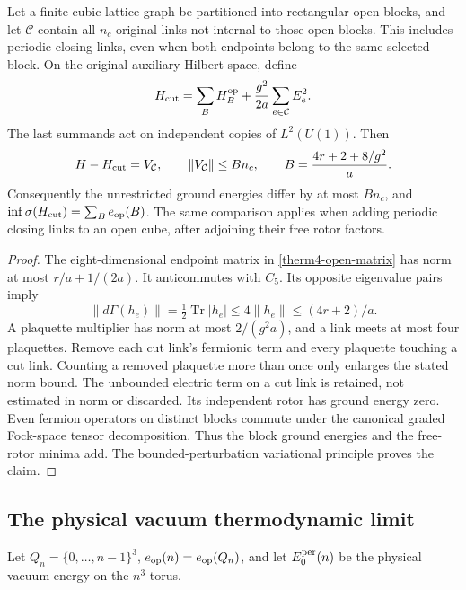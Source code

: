 \begin{lemma}
\label{therm4-cut}
Let a finite cubic lattice graph be partitioned into rectangular
open blocks, and let $\mathcal C$ contain all $n_c$ original links
not internal to those open blocks. This includes periodic closing
links, even when both endpoints belong to the same selected block.
On the original auxiliary Hilbert space, define
\[
 H_{\rm cut}=\sum_B H_B^{\rm op}
                 +\frac{g^2}{2a}\sum_{e\in\mathcal C}E_e^2.
\]
The last summands act on independent copies of $L^2(U(1))$.
Then
\begin{equation}
 H-H_{\rm cut}=V_{\mathcal C},\qquad
 \|V_{\mathcal C}\|\le Bn_c,\qquad
 B=\frac{4r+2+8/g^2}{a}.
 \label{therm4-cut-norm}
\end{equation}
Consequently the unrestricted ground energies differ by at most
$Bn_c$, and $\inf\sigma(H_{\rm cut})=\sum_B e_{\rm op}(B)$.
The same comparison applies when adding periodic closing links to an
open cube, after adjoining their free rotor factors.
\end{lemma}
\begin{proof}
The eight-dimensional endpoint matrix in \eqref{therm4-open-matrix}
has norm at most $r/a+1/(2a)$.  It anticommutes with $C_5$.
Its opposite eigenvalue pairs imply
\[
 \|d\Gamma(h_e)\|=\tfrac12\operatorname{Tr}|h_e|
 \le4\|h_e\|\le(4r+2)/a.
\]
A plaquette multiplier has norm at most $2/(g^2a)$, and a link meets
at most four plaquettes.  Remove each cut link's fermionic term and
every plaquette touching a cut link.  Counting a removed plaquette
more than once only enlarges the stated norm bound.
The unbounded electric term on a cut link is retained, not estimated
in norm or discarded.  Its independent rotor has ground energy zero.
Even fermion operators on distinct blocks commute under the canonical
graded Fock-space tensor decomposition.  Thus the block ground
energies and the free-rotor minima add.  The bounded-perturbation
variational principle proves the claim.
\end{proof}

\subsection{The physical vacuum thermodynamic limit}

Let $Q_n=\{0,\ldots,n-1\}^3$, $e_{\rm op}(n)=e_{\rm op}(Q_n)$, and
let $E_0^{\rm per}(n)$ be the physical vacuum energy on the $n^3$ torus.


